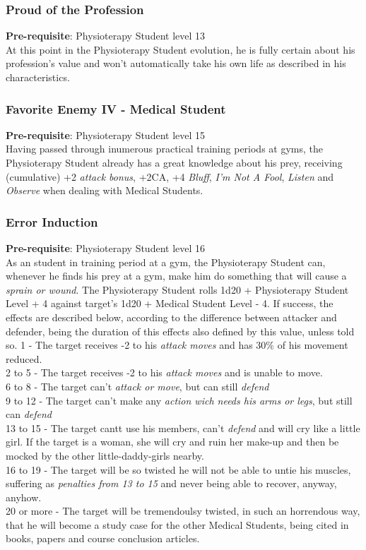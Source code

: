 \documentclass[ letterpaper,12pt]{article}
\begin{document}
\subsubsection{Proud of the Profession}
 {\bf Pre-requisite}: Physioterapy Student level 13\\
 At this point in the Physioterapy Student evolution, he is fully certain about his profession's value and won't automatically take his own life as described in his characteristics.

\subsubsection{Favorite Enemy IV - Medical Student}
 {\bf Pre-requisite}: Physioterapy Student level 15\\
 Having passed through inumerous practical training periods at gyms, the Physioterapy Student already has a great knowledge about his prey, receiving (cumulative) +2 {\it attack bonus}, +2CA, +4 {\it Bluff}, {\it I'm Not A Fool}, {\it Listen} and {\it Observe} when dealing with Medical Students.

\subsubsection{Error Induction}
 {\bf Pre-requisite}: Physioterapy Student level 16\\
 As an student in training period at a gym, the Physioterapy Student can, whenever he finds his prey at a gym, make him do something that will cause a {\it sprain or wound}. The Physioterapy Student rolls 1d20 + Physioterapy Student Level + 4 against target's 1d20 + Medical Student Level - 4. If success, the effects are described below, according to the difference between attacker and defender, being the duration of this effects also defined by this value, unless told so.
1 - The target receives -2 to his {\it attack moves} and has 30\% of his {movement} reduced.\\
2 to 5 - The target receives -2 to his {\it attack moves} and is unable to move.\\
6 to 8 - The target can't {\it attack or move}, but can still {\it defend}\\
9 to 12 - The target can't make any {\it action wich needs his arms or legs}, but still can {\it defend}\\
13 to 15 - The target cantt use his members, can't {\it defend} and will cry like a little girl. If the target is a woman, she will cry and ruin her make-up and then be mocked by the other little-daddy-girls nearby.\\
16 to 19 - The target will be so twisted he will not be able to untie his muscles, suffering as {\it penalties from 13 to 15} and never being able to recover, anyway, anyhow.\\
20 or more - The target will be tremendoulsy twisted, in such an horrendous way, that he will become a study case for the other Medical Students, being cited in books, papers and course conclusion articles. \\
\end{document}

